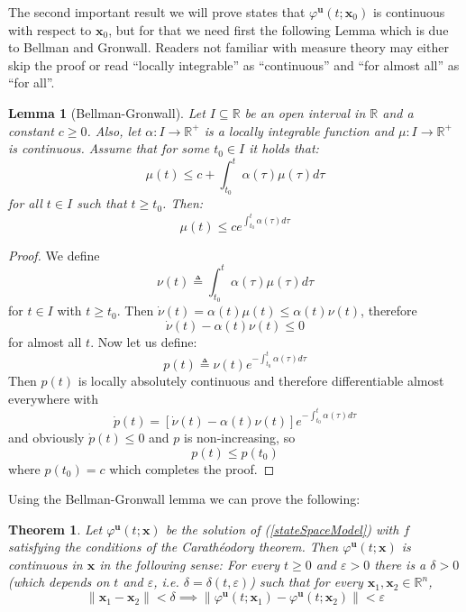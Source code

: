 \documentclass[a4paper,10pt,oneside]{book}
\newtheorem{theorem}{Theorem}
\newtheorem{lemma}{Lemma}
\begin{document}
The second important result we will prove states that $\varphi^{\mathbf{u}}(t;\mathbf{x}_0)$ is continuous with respect to $\mathbf{x}_0$, but for that we need first the following Lemma which is due to Bellman and Gronwall. Readers not familiar with measure theory may either skip the proof or read ``locally integrable'' as ``continuous'' and ``for almost all'' as ``for all''.
\begin{lemma}[Bellman-Gronwall]
 Let $I\subseteq \mathbb{R}$ be an open interval in $\mathbb{R}$ and a constant $c\geq 0$. Also, let $\alpha:I\to\mathbb{R}^+$ is a locally integrable function and $\mu:I\to\mathbb{R}^+$ is continuous. Assume that for some $t_0\in I$ it holds that:
\begin{equation}
 \mu(t)\leq c + \int_{t_0}^t\alpha(\tau)\mu(\tau)d\tau
\end{equation}
for all $t\in I$ such that $t\geq t_0$. Then:
\begin{equation}
 \mu(t)\leq c e^{\int_{t_0}^t \alpha(\tau)d\tau}
\end{equation}
\end{lemma}
\begin{proof}
 We define
\begin{equation}
 \nu(t)\triangleq \int_{t_0}^t\alpha(\tau)\mu(\tau)d\tau
\end{equation}
for $t\in I$ with $t\geq t_0$. Then $\dot{\nu}(t)=\alpha(t)\mu(t)\leq\alpha(t)\nu(t)$, therefore
\begin{equation}
 \dot{\nu}(t)-\alpha(t)\nu(t) \leq 0
\end{equation}
for almost all $t$. Now let us define:
\begin{equation}
 p(t)\triangleq\nu(t)e^{-\int_{t_0}^{t}\alpha(\tau)d\tau}
\end{equation}
Then $p(t)$ is locally absolutely continuous and therefore differentiable almost everywhere with
\begin{equation}
 \dot{p}(t)=\left[ \dot{\nu}(t)-\alpha(t)\nu(t) \right]e^{-\int_{t_0}^{t}\alpha(\tau)d\tau}
\end{equation}
and obviously $\dot{p}(t)\leq0$ and $p$ is non-increasing, so
\begin{equation}
 p(t)\leq p(t_0)
\end{equation}
where $p(t_0)=c$ which completes the proof.
\end{proof}
Using the Bellman-Gronwall lemma we can prove the following:
\begin{theorem}\label{thm:continuityOfSolutions}
 Let $\varphi^{\mathbf{u}}(t;\mathbf{x})$ be the solution of (\ref{stateSpaceModel}) with $f$ satisfying the conditions of the Carath\'{e}odory  theorem. Then $\varphi^{\mathbf{u}}(t;\mathbf{x})$ is continuous in $\mathbf{x}$ in the following sense: For every $t\geq 0$ and $\varepsilon>0$ there is a $\delta>0$ (which depends on $t$ and $\varepsilon$, i.e. $\delta=\delta(t,\varepsilon)$) such that for every $\mathbf{x}_1,\mathbf{x}_2\in\mathbb{R}^n$, 
\begin{equation}
\|\mathbf{x}_1-\mathbf{x}_2\|<\delta\implies \|\varphi^{\mathbf{u}}(t;\mathbf{x}_1)-\varphi^{\mathbf{u}}(t;\mathbf{x}_2) \| < \varepsilon 
\end{equation}
\end{theorem}
\end{document}
